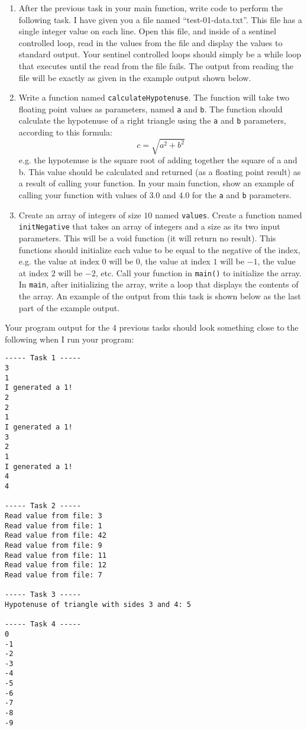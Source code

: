 \documentclass[11pt]{article}
\begin{document}
\begin{enumerate}
\item After the previous task in your main function, write code to
   perform the following task.  I have given you a file named
   ``test-01-data.txt''.  This file has a single integer value on each
   line.  Open this file, and inside of a sentinel controlled loop,
   read in the values from the file and display the values to standard
   output.  Your sentinel controlled loops should simply be a while
   loop that executes until the read from the file fails.  The output
   from reading the file will be exactly as given in the example
   output shown below.
\item Write a function named \verb~calculateHypotenuse~.  The function will
   take two floating point values as parameters, named \verb~a~ and \verb~b~.
   The function should calculate the hypotenuse of a right triangle
   using the \verb~a~ and \verb~b~ parameters, according to this formula: $$ c =
   \sqrt{a^2 + b^2} $$ e.g. the hypotenuse is the square root of
   adding together the square of a and b.  This value should be
   calculated and returned (as a floating point result) as a result of
   calling your function.  In your main function, show an example of
   calling your function with values of $3.0$ and $4.0$ for the \verb~a~
   and \verb~b~ parameters.
\item Create an array of integers of size $10$ named \verb~values~.  Create a
   function named \verb~initNegative~ that takes an array of integers and a
   size as its two input parameters.  This will be a void function (it
   will return no result).  This functions should initialize each
   value to be equal to the negative of the index, e.g. the value at
   index $0$ will be $0$, the value at index $1$ will be $-1$, the
   value at index $2$ will be $-2$, etc.  Call your function in
   \verb~main()~ to initialize the array.  In \verb~main~, after initializing
   the array, write a loop that displays the contents of the array.
   An example of the output from this task is shown below as the last
   part of the example output.
\end{enumerate}

Your program output for the 4 previous tasks should look something
close to the following when I run your program:


\begin{verbatim}
----- Task 1 -----
3
1
I generated a 1!
2
2
1
I generated a 1!
3
2
1
I generated a 1!
4
4

----- Task 2 -----
Read value from file: 3
Read value from file: 1
Read value from file: 42
Read value from file: 9
Read value from file: 11
Read value from file: 12
Read value from file: 7

----- Task 3 -----
Hypotenuse of triangle with sides 3 and 4: 5

----- Task 4 -----
0
-1
-2
-3
-4
-5
-6
-7
-8
-9
\end{verbatim}
\end{document}
